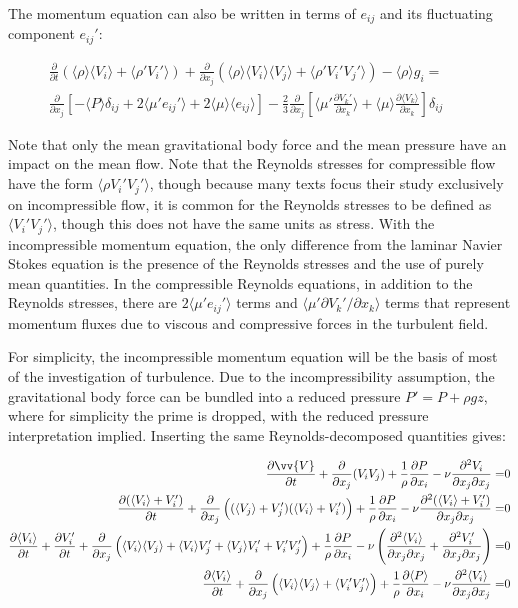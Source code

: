 \documentclass[10pt]{article}
\newcommand{\beqa}{\begin{equation}\begin{aligned}}
\newcommand{\eeqa}{\end{aligned}\end{equation}}
\newcommand{\la}{\langle}
\newcommand{\ra}{\rangle}
\newcounter{subsubsubsection}[subsubsection]
\begin{document}
\begin{flushleft}
The momentum equation can also be written in terms of \(e_{ij}\) and its fluctuating component \(e_{ij}'\):

\beqa
\frac{\partial}{\partial t}\left(\la \rho\ra\la V_i\ra+\la\rho' V_i'\ra\right)+\frac{\partial}{\partial x_j}\left(\la\rho\ra\la V_i\ra\la V_j\ra+\la\rho'V_i'V_j'\ra\right)-\la\rho\ra g_i= \quad\quad\\
\frac{\partial}{\partial x_j}\left\lbrack-\la P\ra\delta_{ij}+2\la\mu'e_{ij}'\ra+2\la\mu\ra\la e_{ij}\ra\right\rbrack-\frac{2}{3}\frac{\partial}{\partial x_j}\left\lbrack\la\mu'\frac{\partial V_k'}{\partial x_k}\ra+\la\mu\ra\frac{\partial \la V_k\ra}{\partial x_k}\right\rbrack\delta_{ij}
\eeqa

Note that only the mean gravitational body force and the mean pressure have an impact on the mean flow.  Note that the Reynolds stresses for compressible flow have the form \(\la\rho V_i'V_j'\ra\), though because many texts focus their study exclusively on incompressible flow, it is common for the Reynolds stresses to be defined as \(\la V_i'V_j'\ra\), though this does not have the same units as stress. With the incompressible momentum equation, the only difference from the laminar Navier Stokes equation is the presence of the Reynolds stresses and the use of purely mean quantities. In the compressible Reynolds equations, in addition to the Reynolds stresses, there are \(2\la\mu'e_{ij}'\ra\) terms and \(\la\mu'\partial V_k'/\partial x_k\ra\) terms that represent momentum fluxes due to viscous and compressive forces in the turbulent field.



For simplicity, the incompressible momentum equation will be the basis of most of the investigation of turbulence. Due to the incompressibility assumption, the gravitational body force can be bundled into a reduced pressure \(P'=P+\rho gz\), where for simplicity the prime is dropped, with the reduced pressure interpretation implied. Inserting the same Reynolds-decomposed quantities gives:

\beqa
\label{eq:AveNS}
\frac{\partial \vv{V}}{\partial t}+\frac{\partial}{\partial x_j}(V_iV_j)+\frac{1}{\rho}\frac{\partial P}{\partial x_i}-\nu\frac{\partial^2 V_i}{\partial x_j\partial x_j}=&0\\
\frac{\partial (\la V_i\ra+V_i')}{\partial t}+\frac{\partial}{\partial x_j}\left((\la V_j\ra+V_j')(\la V_i\ra+V_i')\right)+\frac{1}{\rho}\frac{\partial P}{\partial x_i}-\nu\frac{\partial^2 (\la V_i\ra+V_i')}{\partial x_j\partial x_j}=&0\\
\frac{\partial \la V_i\ra}{\partial t}+\frac{\partial V_i'}{\partial t}+\frac{\partial}{\partial x_j}\left(\la V_i\ra\la V_j\ra+\la V_i\ra V_j'+\la V_j\ra V_i'+V_i'V_j'\right)+\frac{1}{\rho}\frac{\partial P}{\partial x_i}-\nu\left(\frac{\partial^2 \la V_i\ra}{\partial x_j\partial x_j}+\frac{\partial^2 V_i'}{\partial x_j\partial x_j}\right)=&0\\
\frac{\partial \la V_i\ra}{\partial t}+\frac{\partial}{\partial x_j}\left(\la V_i\ra\la V_j\ra+\la V_i'V_j'\ra\right)+\frac{1}{\rho}\frac{\partial \la P\ra}{\partial x_i}-\nu\frac{\partial^2 \la V_i\ra}{\partial x_j\partial x_j}=&0\\
\eeqa


\end{flushleft}
\end{document}
